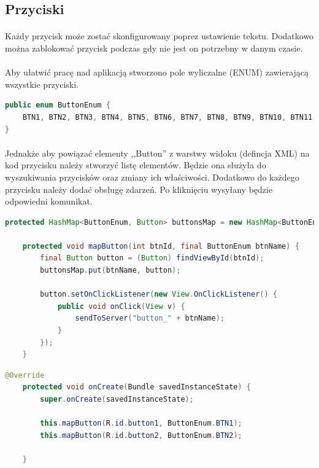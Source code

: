 \subsection{Przyciski}
\paragraph{}
Każdy przycisk może zostać skonfigurowany poprez ustawienie tekstu. Dodatkowo można zablokować przycisk podczas gdy nie jest on potrzebny w danym czasie.
\paragraph{}
Aby ułatwić pracę nad aplikacją stworzono pole wyliczalne (ENUM) zawierającą wszystkie przyciski.

\begin{lstlisting}[language=Java]
public enum ButtonEnum {
    BTN1, BTN2, BTN3, BTN4, BTN5, BTN6, BTN7, BTN8, BTN9, BTN10, BTN11
}
\end{lstlisting}
\paragraph{}
Jednakże aby powiązać elementy ,,Button'' z warstwy widoku (defincja XML) na kod przycisku  należy stworzyć listę elementów. Będzie ona służyła do wyszukiwania przycisków oraz zmiany ich właściwości. Dodatkowo do każdego przycisku należy dodać obsługę zdarzeń. Po kliknięciu wysyłany będzie odpowiedni komunikat.

\begin{lstlisting}[language=Java]
    protected HashMap<ButtonEnum, Button> buttonsMap = new HashMap<ButtonEnum, Button>();

    protected void mapButton(int btnId, final ButtonEnum btnName) {
        final Button button = (Button) findViewById(btnId);
        buttonsMap.put(btnName, button);

        button.setOnClickListener(new View.OnClickListener() {
            public void onClick(View v) {
                sendToServer("button_" + btnName);
            }
        });
    }
\end{lstlisting}


\begin{lstlisting}[language=Java]
 @Override
    protected void onCreate(Bundle savedInstanceState) {
        super.onCreate(savedInstanceState);

        this.mapButton(R.id.button1, ButtonEnum.BTN1);
        this.mapButton(R.id.button2, ButtonEnum.BTN2);

    }
\end{lstlisting}

